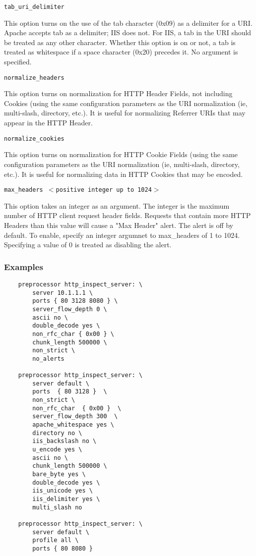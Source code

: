 \documentclass[english]{report}
\newcounter{slistnum}
\newenvironment{slist}
{ \begin{list}{ {\bf \arabic{slistnum}.} }{\usecounter{slistnum} } }
{ \end{list} }
\begin{document}
\begin{slist}
\item \texttt{tab\_uri\_delimiter}

This option turns on the use of the tab character (0x09) as a delimiter for a
URI.  Apache accepts tab as a delimiter; IIS does not.  For IIS, a tab in the
URI should be treated as any other character.  Whether this option is on or
not, a tab is treated as whitespace if a space character (0x20) precedes it.
No argument is specified.

\item \texttt{normalize\_headers}

This option turns on normalization for HTTP Header Fields, not including
Cookies (using the same configuration parameters as the URI normalization (ie,
multi-slash, directory, etc.).  It is useful for normalizing Referrer URIs that
may appear in the HTTP Header.

\item \texttt{normalize\_cookies}

This option turns on normalization for HTTP Cookie Fields (using the same
configuration parameters as the URI normalization (ie, multi-slash, directory,
etc.).  It is useful for normalizing data in HTTP Cookies that may be encoded.

\item \texttt{max\_headers $<$positive integer up to 1024$>$}

This option takes an integer as an argument.  The integer is the maximum number
of HTTP client request header fields.  Requests that contain more HTTP Headers
than this value will cause a "Max Header" alert.  The alert is off by default.
To enable, specify an integer argumnet to max\_headers of 1 to 1024.
Specifying a value of 0 is treated as disabling the alert.

\end{slist}

\subsubsection{Examples}

\begin{verbatim}
    preprocessor http_inspect_server: \
        server 10.1.1.1 \
        ports { 80 3128 8080 } \
        server_flow_depth 0 \
        ascii no \
        double_decode yes \
        non_rfc_char { 0x00 } \
        chunk_length 500000 \
        non_strict \
        no_alerts

    preprocessor http_inspect_server: \
        server default \ 
        ports  { 80 3128 }  \
        non_strict \
        non_rfc_char  { 0x00 }  \
        server_flow_depth 300  \
        apache_whitespace yes \
        directory no \
        iis_backslash no \
        u_encode yes \
        ascii no \
        chunk_length 500000 \
        bare_byte yes \
        double_decode yes \
        iis_unicode yes \ 
        iis_delimiter yes \
        multi_slash no

    preprocessor http_inspect_server: \
        server default \
        profile all \
        ports { 80 8080 }
\end{verbatim}
\end{document}
